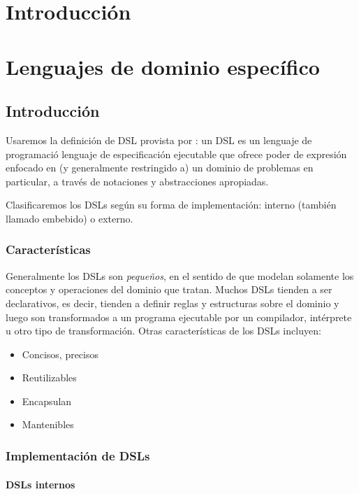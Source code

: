 \documentclass[12pt]{report}
\begin{document}
\chapter{Introducci\'on}

\chapter{Lenguajes de dominio espec\'ifico}

\section{Introducci\'on}

Usaremos la definición de DSL provista por \cite{van2000domain}: un DSL es un lenguaje de programació lenguaje de especificación ejecutable que ofrece poder de expresión enfocado en (y generalmente restringido a) un dominio de problemas en particular, a través de notaciones y abstracciones apropiadas.

Clasificaremos los DSLs según su forma de implementación: interno (también llamado embebido) o externo.

\subsection{Caracter\'isticas}

Generalmente los DSLs son \textit{pequeños}, en el sentido de que modelan solamente los conceptos y operaciones del dominio que tratan. Muchos DSLs tienden a ser declarativos, es decir, tienden a definir reglas y estructuras sobre el dominio y luego son transformados a un programa ejecutable por un compilador, intérprete u otro tipo de transformación. \cite{van2000domain}
Otras características de los DSLs incluyen: \cite{van2000domain}

\begin{itemize}
	\item Concisos, precisos
	\item Reutilizables
	\item Encapsulan 
	\item Mantenibles \cite{van1998little}
\end{itemize}



\subsection{Implementaci\'on de DSLs}

\subsubsection{DSLs internos}
\end{document}
